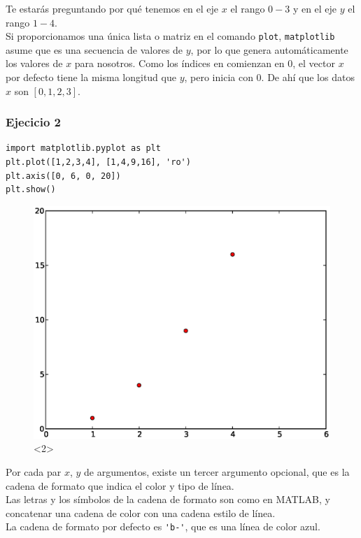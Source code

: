 \begin{frame}
Te estarás preguntando por qué tenemos en el eje $x$ el rango $0-3$ y en el eje $y$ el rango  $1-4$.
\\
\medskip
Si proporcionamos una única lista o matriz en el comando \texttt{plot}, \texttt{matplotlib} asume que es una secuencia de valores de $y$, por lo que genera automáticamente los valores de $x$ para nosotros. Como los índices en \python comienzan en $0$, el vector $x$ por defecto tiene la misma longitud que $y$, pero inicia con 0. De ahí que los datos $x$ son $[0,1,2,3]$.
\end{frame}
\begin{frame}[fragile]
\frametitle{Ejecicio 2}
\begin{lstlisting}
import matplotlib.pyplot as plt
plt.plot([1,2,3,4], [1,4,9,16], 'ro')
plt.axis([0, 6, 0, 20])
plt.show()
\end{lstlisting}
\begin{figure}
	\centering
	\includegraphics[scale=0.35]{plotEjercicio2.eps}<2> 
\end{figure}
\end{frame}
\begin{frame}[fragile]
Por cada par $x$, $y$ de argumentos, existe un tercer argumento opcional, que es la cadena de formato que indica el color y tipo de línea.
\\
\medskip
Las letras y los símbolos de la cadena de formato son como en MATLAB, y concatenar una cadena de color con una cadena estilo de línea.
\\
\medskip
La cadena de formato por defecto es \verb|'b-'|, que es una línea de color azul.
\end{frame}
